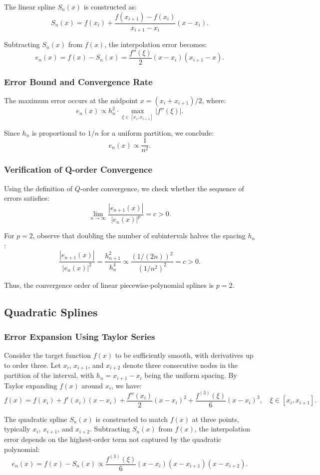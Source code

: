 \documentclass{article}
\begin{document}
The linear spline $S_n(x)$ is constructed as:
\[
S_n(x) = f(x_i) + \frac{f(x_{i+1}) - f(x_i)}{x_{i+1} - x_i}(x - x_i).
\]

Subtracting $S_n(x)$ from $f(x)$, the interpolation error becomes:
\[
e_n(x) = f(x) - S_n(x) = \frac{f''(\xi)}{2}(x - x_i)(x_{i+1} - x).
\]

\subsubsection{Error Bound and Convergence Rate}
The maximum error occurs at the midpoint $x = (x_i + x_{i+1})/2$, where:
\[
e_n(x) \propto h_n^2 \cdot \max_{\xi \in [x_i, x_{i+1}]} |f''(\xi)|.
\]

Since $h_n$ is proportional to $1/n$ for a uniform partition, we conclude:
\[
e_n(x) \propto \frac{1}{n^2}.
\]

\subsubsection{Verification of Q-order Convergence}
Using the definition of $Q$-order convergence, we check whether the sequence of errors satisfies:
\[
\lim_{n \to \infty} \frac{|e_{n+1}(x)|}{|e_n(x)|^p} = c > 0.
\]

For $p = 2$, observe that doubling the number of subintervals halves the spacing $h_n$:
\[
\frac{|e_{n+1}(x)|}{|e_n(x)|^2} = \frac{h_{n+1}^2}{h_n^4} \propto \frac{(1/(2n))^2}{(1/n^2)^2} = c > 0.
\]

Thus, the convergence order of linear piecewise-polynomial splines is $p = 2$.

\subsection{Quadratic Splines}

\subsubsection{Error Expansion Using Taylor Series}
Consider the target function $f(x)$ to be sufficiently smooth, with derivatives up to order three. Let $x_i$, $x_{i+1}$, and $x_{i+2}$ denote three consecutive nodes in the partition of the interval, with $h_n = x_{i+1} - x_i$ being the uniform spacing. By Taylor expanding $f(x)$ around $x_i$, we have:
\[
f(x) = f(x_i) + f'(x_i)(x - x_i) + \frac{f''(x_i)}{2}(x - x_i)^2 + \frac{f^{(3)}(\xi)}{6}(x - x_i)^3, \quad \xi \in [x_i, x_{i+1}].
\]

The quadratic spline $S_n(x)$ is constructed to match $f(x)$ at three points, typically $x_i$, $x_{i+1}$, and $x_{i+2}$. Subtracting $S_n(x)$ from $f(x)$, the interpolation error depends on the highest-order term not captured by the quadratic polynomial:
\[
e_n(x) = f(x) - S_n(x) \propto \frac{f^{(3)}(\xi)}{6}(x - x_i)(x - x_{i+1})(x - x_{i+2}).
\]
\end{document}
